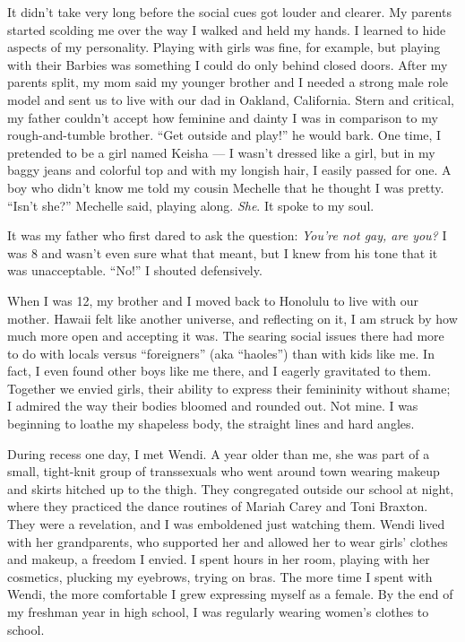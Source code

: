 \documentclass{article}
\begin{document}
It didn't take very long before the social cues got louder and clearer. My
parents started scolding me over the way I walked and held my hands. I learned
to hide aspects of my personality. Playing with girls was fine, for example,
but playing with their Barbies was something I could do only behind closed
doors. After my parents split, my mom said my younger brother and I needed a
strong male role model and sent us to live with our dad in Oakland, California.
Stern and critical, my father couldn't accept how feminine and dainty I was in
comparison to my rough-and-tumble brother. ``Get outside and play!'' he would
bark. One time, I pretended to be a girl named Keisha — I wasn't dressed like a
girl, but in my baggy jeans and colorful top and with my longish hair, I easily
passed for one. A boy who didn't know me told my cousin Mechelle that he
thought I was pretty. ``Isn't she?'' Mechelle said, playing along. \emph{She}.
It spoke to my soul.

It was my father who first dared to ask the question: \emph{You're not gay, are
you?} I was 8 and wasn't even sure what that meant, but I knew from his tone
that it was unacceptable. ``No!'' I shouted defensively.

When I was 12, my brother and I moved back to Honolulu to live with our mother.
Hawaii felt like another universe, and reflecting on it, I am struck by how
much more open and accepting it was. The searing social issues there had more
to do with locals versus ``foreigners'' (aka ``haoles'') than with kids like
me. In fact, I even found other boys like me there, and I eagerly gravitated to
them.  Together we envied girls, their ability to express their femininity
without shame; I admired the way their bodies bloomed and rounded out. Not
mine. I was beginning to loathe my shapeless body, the straight lines and hard
angles.

During recess one day, I met Wendi. A year older than me, she was part of a
small, tight-knit group of transsexuals who went around town wearing makeup and
skirts hitched up to the thigh. They congregated outside our school at night,
where they practiced the dance routines of Mariah Carey and Toni Braxton. They
were a revelation, and I was emboldened just watching them. Wendi lived with
her grandparents, who supported her and allowed her to wear girls' clothes and
makeup, a freedom I envied. I spent hours in her room, playing with her
cosmetics, plucking my eyebrows, trying on bras. The more time I spent with
Wendi, the more comfortable I grew expressing myself as a female. By the end of
my freshman year in high school, I was regularly wearing women's clothes to
school.
\end{document}
